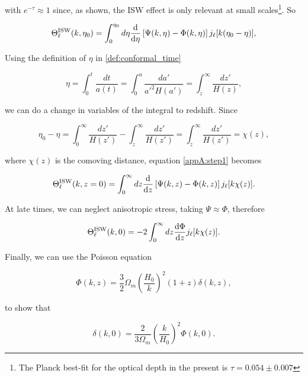 \documentclass[openany,a4paper,12pt,oneside]{book}
\begin{document}
\begin{spacing}{1.5}
\noindent with $e^{-\tau}\approx 1$ since, as shown, the ISW effect is only relevant at small scales\footnote{The Planck best-fit for the optical depth in the present is $\tau=0.054\pm 0.007$}. So

\begin{equation}\label{appA:step1}
	\Theta_\ell^{\text{ISW}}(k,\eta_0)=\int_0^{\eta_0} d\eta \dv{}{\eta}\left[\Psi(k,\eta)-\Phi(k,\eta)\right]j_\ell[k(\eta_0-\eta)],
\end{equation}

Using the definition of $\eta$ in \eqref{def:conformal_time}

\begin{equation}
	\eta=\int_0^t \frac{dt}{a(t)}=\int_0^a\frac{da'}{a'^2H(a')}=\int_{z}^\infty \frac{dz'}{H(z)},
\end{equation}

\noindent we can do a change in variables of the integral to redshift. Since

\begin{equation}
	\eta_0-\eta=\int_0^\infty \frac{dz'}{H(z')}-\int_z^\infty \frac{dz'}{H(z')}=\int_z^\infty \frac{dz'}{H(z')}=\chi(z),
\end{equation}

\noindent where $\chi(z)$ is the comoving distance, equation \eqref{appA:step1} becomes

\begin{equation}
	\Theta_\ell^\text{ISW}(k,z=0)=\int_0^\infty dz \dv{}{z}\left[\Psi(k,z)-\Phi(k,z)\right]j_\ell[k\chi(z)].
\end{equation}

At late times, we can neglect anisotropic stress, taking $\Psi\approx \Phi$, therefore

\begin{equation}
	\Theta_\ell^\text{ISW}(k,0)=-2\int_0^\infty dz \dv{\Phi}{z}j_\ell [k\chi(z)].
\end{equation}

Finally, we can use the Poisson equation

\begin{equation}
	\Phi(k,z)=\frac{3}{2}\Omega_m \left(\frac{H_0}{k}\right)^2(1+z)\delta(k,z),
\end{equation}

\noindent to show that

\begin{equation}
	\delta(k,0)=\frac{2}{3\Omega_m}\left(\frac{k}{H_0}\right)^2\Phi(k,0).
\end{equation}


\end{spacing}
\end{document}
